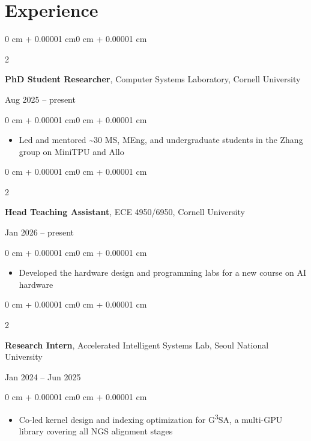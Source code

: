\documentclass[10pt, letterpaper]{article}
\newenvironment{highlights}{
    \begin{itemize}[
        topsep=0.06 cm, parsep=0.06 cm, partopsep=0pt,
        itemsep=0pt, leftmargin=0 cm + 10pt
    ]
}{
    \end{itemize}
}
\newenvironment{onecolentry}{
    \begin{adjustwidth}{0 cm + 0.00001 cm}{0 cm + 0.00001 cm}
}{
    \end{adjustwidth}
}
\newenvironment{twocolentry}[2][]{
    \onecolentry
    \def\secondColumn{#2}
    \setcolumnwidth{\fill, 3.4 cm}
    \begin{paracol}{2}
}{
    \switchcolumn \raggedleft \secondColumn
    \end{paracol}
    \endonecolentry
}
\begin{document}
    \section{Experience}

        \begin{twocolentry}{Aug 2025 -- present}
            \textbf{PhD Student Researcher}, Computer Systems Laboratory, Cornell University
        \end{twocolentry}

        \vspace{0.12 cm}
        \begin{onecolentry}
            \begin{highlights}
                \item Led and mentored \textasciitilde30 MS, MEng, and undergraduate students in the Zhang group on MiniTPU and Allo
            \end{highlights}
        \end{onecolentry}

        \vspace{0.18 cm}

        \begin{twocolentry}{Jan 2026 -- present}
            \textbf{Head Teaching Assistant}, ECE 4950/6950, Cornell University
        \end{twocolentry}

        \vspace{0.12 cm}
        \begin{onecolentry}
            \begin{highlights}
                \item Developed the hardware design and programming labs for a new course on AI hardware
            \end{highlights}
        \end{onecolentry}

        \vspace{0.18 cm}

        \begin{twocolentry}{Jan 2024 -- Jun 2025}
            \textbf{Research Intern}, Accelerated Intelligent Systems Lab, Seoul National University
        \end{twocolentry}

        \vspace{0.12 cm}
        \begin{onecolentry}
            \begin{highlights}
                \item Co-led kernel design and indexing optimization for G\textsuperscript{3}SA, a multi-GPU library covering all NGS alignment stages
            \end{highlights}
        \end{onecolentry}
\end{document}
